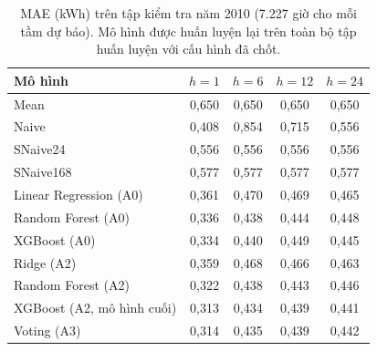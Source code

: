 \begin{table}[htbp]
\centering
\caption[Kết quả trên tập kiểm tra]{MAE (kWh) trên tập kiểm tra năm 2010 (7.227 giờ cho mỗi tầm dự báo). Mô hình được huấn luyện lại trên toàn bộ tập huấn luyện với cấu hình đã chốt.}
\label{tab:test}
\small
\begin{tabular}{|l|c|c|c|c|}
\hline
\textbf{Mô hình} & \textbf{$h = 1$} & \textbf{$h = 6$} & \textbf{$h = 12$} & \textbf{$h = 24$} \\
\hline
Mean & 0{,}650 & 0{,}650 & 0{,}650 & 0{,}650 \\ \hline
Naive & 0{,}408 & 0{,}854 & 0{,}715 & 0{,}556 \\ \hline
SNaive24 & 0{,}556 & 0{,}556 & 0{,}556 & 0{,}556 \\ \hline
SNaive168 & 0{,}577 & 0{,}577 & 0{,}577 & 0{,}577 \\ \hline
Linear Regression (A0) & 0{,}361 & 0{,}470 & 0{,}469 & 0{,}465 \\ \hline
Random Forest (A0) & 0{,}336 & 0{,}438 & 0{,}444 & 0{,}448 \\ \hline
XGBoost (A0) & 0{,}334 & 0{,}440 & 0{,}449 & 0{,}445 \\ \hline
Ridge (A2) & 0{,}359 & 0{,}468 & 0{,}466 & 0{,}463 \\ \hline
Random Forest (A2) & 0{,}322 & 0{,}438 & 0{,}443 & 0{,}446 \\ \hline
XGBoost (A2, mô hình cuối) & 0{,}313 & 0{,}434 & 0{,}439 & 0{,}441 \\ \hline
Voting (A3) & 0{,}314 & 0{,}435 & 0{,}439 & 0{,}442 \\ \hline
\end{tabular}
\end{table}
